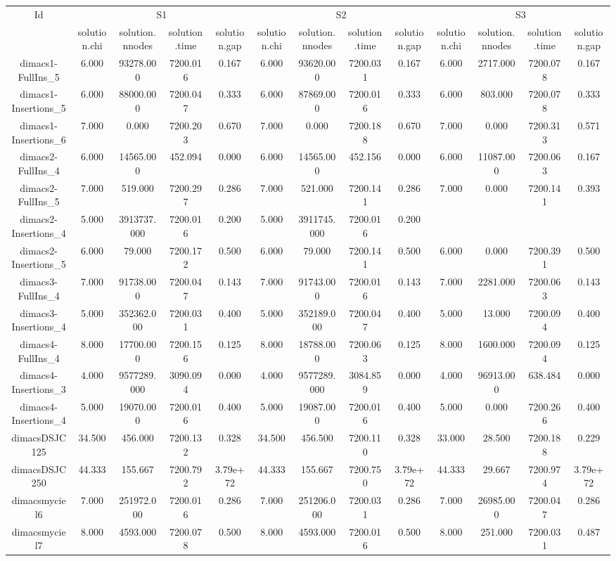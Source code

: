 \documentclass[landscape, 12pt]{report}
\begin{document}
\begin{tabular}{|c|cccc|cccc|cccc|}
\hline
\multicolumn{1}{|c|}{Id} & \multicolumn{4}{|c|}{S1} & \multicolumn{4}{|c|}{S2} & \multicolumn{4}{|c|}{S3}
\\
 & solution.chi & solution.nnodes & solution.time & solution.gap & solution.chi & solution.nnodes & solution.time & solution.gap & solution.chi & solution.nnodes & solution.time & solution.gap
\\
\hline
dimacs1-FullIns\_5 & 6.000 & 93278.000 & 7200.016 & 0.167 & 6.000 & 93620.000 & 7200.031 & 0.167 & 6.000 & 2717.000 & 7200.078 & 0.167
\\
dimacs1-Insertions\_5 & 6.000 & 88000.000 & 7200.047 & 0.333 & 6.000 & 87869.000 & 7200.016 & 0.333 & 6.000 & 803.000 & 7200.078 & 0.333
\\
dimacs1-Insertions\_6 & 7.000 & 0.000 & 7200.203 & 0.670 & 7.000 & 0.000 & 7200.188 & 0.670 & 7.000 & 0.000 & 7200.313 & 0.571
\\
dimacs2-FullIns\_4 & 6.000 & 14565.000 & 452.094 & 0.000 & 6.000 & 14565.000 & 452.156 & 0.000 & 6.000 & 11087.000 & 7200.063 & 0.167
\\
dimacs2-FullIns\_5 & 7.000 & 519.000 & 7200.297 & 0.286 & 7.000 & 521.000 & 7200.141 & 0.286 & 7.000 & 0.000 & 7200.141 & 0.393
\\
dimacs2-Insertions\_4 & 5.000 & 3913737.000 & 7200.016 & 0.200 & 5.000 & 3911745.000 & 7200.016 & 0.200
\\
dimacs2-Insertions\_5 & 6.000 & 79.000 & 7200.172 & 0.500 & 6.000 & 79.000 & 7200.141 & 0.500 & 6.000 & 0.000 & 7200.391 & 0.500
\\
dimacs3-FullIns\_4 & 7.000 & 91738.000 & 7200.047 & 0.143 & 7.000 & 91743.000 & 7200.016 & 0.143 & 7.000 & 2281.000 & 7200.063 & 0.143
\\
dimacs3-Insertions\_4 & 5.000 & 352362.000 & 7200.031 & 0.400 & 5.000 & 352189.000 & 7200.047 & 0.400 & 5.000 & 13.000 & 7200.094 & 0.400
\\
dimacs4-FullIns\_4 & 8.000 & 17700.000 & 7200.156 & 0.125 & 8.000 & 18788.000 & 7200.063 & 0.125 & 8.000 & 1600.000 & 7200.094 & 0.125
\\
dimacs4-Insertions\_3 & 4.000 & 9577289.000 & 3090.094 & 0.000 & 4.000 & 9577289.000 & 3084.859 & 0.000 & 4.000 & 96913.000 & 638.484 & 0.000
\\
dimacs4-Insertions\_4 & 5.000 & 19070.000 & 7200.016 & 0.400 & 5.000 & 19087.000 & 7200.016 & 0.400 & 5.000 & 0.000 & 7200.266 & 0.400
\\
dimacsDSJC125 & 34.500 & 456.000 & 7200.132 & 0.328 & 34.500 & 456.500 & 7200.110 & 0.328 & 33.000 & 28.500 & 7200.188 & 0.229
\\
dimacsDSJC250 & 44.333 & 155.667 & 7200.792 & 3.79e+72 & 44.333 & 155.667 & 7200.750 & 3.79e+72 & 44.333 & 29.667 & 7200.974 & 3.79e+72
\\
dimacsmyciel6 & 7.000 & 251972.000 & 7200.016 & 0.286 & 7.000 & 251206.000 & 7200.031 & 0.286 & 7.000 & 26985.000 & 7200.047 & 0.286
\\
dimacsmyciel7 & 8.000 & 4593.000 & 7200.078 & 0.500 & 8.000 & 4593.000 & 7200.016 & 0.500 & 8.000 & 251.000 & 7200.031 & 0.487
\\
\hline 
 \end{tabular}
\end{document}
